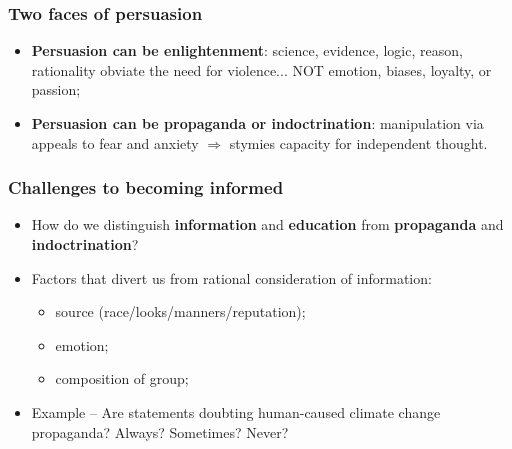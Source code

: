 \documentclass[aspectratio=169]{beamer}
\theoremstyle{principle}
\begin{document}
\begin{frame}
\frametitle{Two faces of persuasion}

\begin{itemize}
\item \textbf{Persuasion can be enlightenment}: science, evidence, logic, reason, rationality obviate the need for violence... NOT emotion, biases, loyalty, or passion;
\bigskip
\bigskip
\bigskip
\item \textbf{Persuasion can be propaganda or indoctrination}: manipulation via appeals to fear and anxiety $\Rightarrow$ stymies capacity for independent thought.
\end{itemize}

\end{frame}

\begin{frame}
\frametitle{Challenges to becoming informed}

\begin{itemize}
\item How do we distinguish \textbf{information} and \textbf{education} from \textbf{propaganda} and \textbf{indoctrination}?
\bigskip
\bigskip
\item Factors that divert us from rational consideration of information:
\begin{itemize}
\item source (race/looks/manners/reputation);
\item emotion;
\item composition of group;
\end{itemize}
\bigskip
\bigskip
\item Example -- Are statements doubting human-caused climate change propaganda?  Always?  Sometimes?  Never?
\end{itemize}

\end{frame}
\end{document}
